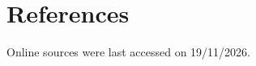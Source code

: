 \section{References}
\label{sec:references}

Online sources were last accessed on 19/11/2026.

\begingroup
\renewcommand{\section}[2]{}

